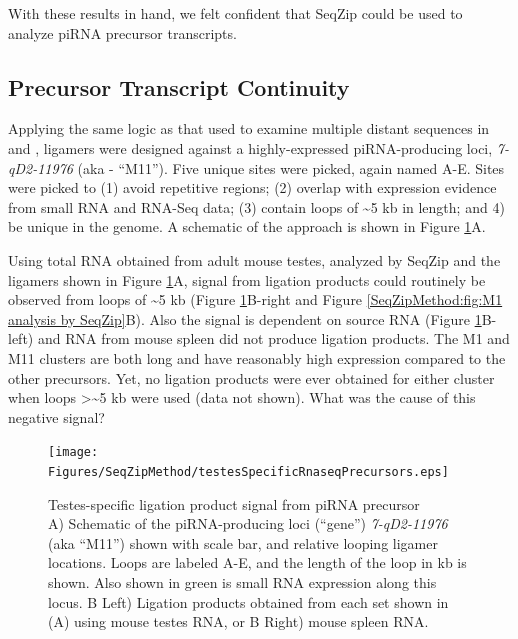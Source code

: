     With these results in hand, we felt confident that SeqZip could be used to analyze piRNA precursor transcripts.

  \subsection{Precursor Transcript Continuity}
    \label{SeqZipMethod:sec:piRNA precursor by SeqZip}

    Applying the same logic as that used to examine multiple distant sequences in \dst{} and \fn{}, ligamers were designed against a highly-expressed piRNA-producing loci, \textit{7-qD2-11976} (aka - ``M11''). Five unique sites were picked, again named A-E. Sites were picked to (1) avoid repetitive regions; (2) overlap with expression evidence from small RNA and RNA-Seq data; (3) contain loops of \textasciitilde5 kb in length; and 4) be unique in the genome. A schematic of the approach is shown in Figure \ref{SeqZipMethod:fig:Precursors are testes-specific}A.

    Using total RNA obtained from adult mouse testes, analyzed by SeqZip and the ligamers shown in Figure \ref{SeqZipMethod:fig:Precursors are testes-specific}A, signal from ligation products could routinely be observed from loops of \textasciitilde5 kb (Figure \ref{SeqZipMethod:fig:Precursors are testes-specific}B-right and Figure \ref{SeqZipMethod:fig:M1 analysis by SeqZip}B). Also the signal is dependent on source RNA (Figure \ref{SeqZipMethod:fig:Precursors are testes-specific}B-left) and RNA from mouse spleen did not produce ligation products. The M1 and M11 clusters are both long and have reasonably high expression compared to the other precursors. Yet, no ligation products were ever obtained for either cluster when loops >\textasciitilde5 kb were used (data not shown). What was the cause of this negative signal?

    \begin{figure} %
        \centering 
        \texttt{[image: Figures/SeqZipMethod/testesSpecificRnaseqPrecursors.eps]}
        \caption[Testes-specific ligation product signal from piRNA precursor]
        {
          Testes-specific ligation product signal from piRNA precursor\\[0.25cm]
          A) Schematic of the piRNA-producing loci (``gene'') \textit{7-qD2-11976} (aka ``M11'') shown with scale bar, and relative looping ligamer locations.  Loops are labeled A-E, and the length of the loop in kb is shown.  Also shown in green is small RNA expression along this locus. B Left) Ligation products obtained from each set shown in (A) using mouse testes RNA, or B Right) mouse spleen RNA.
        	}
        \label{SeqZipMethod:fig:Precursors are testes-specific}
      	\end{figure}

